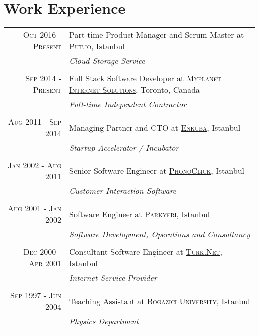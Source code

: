 \documentclass[a4paper,10pt]{article}
\begin{document}
\section{Work Experience}
\begin{tabular}{r|p{11cm}}
  \textsc{Oct 2016 - Present}   & Part-time Product Manager and Scrum Master at \href{https://put.io}{\textsc{Put.io}}, Istanbul \\
                                & \emph{Cloud Storage Service} \\

  \multicolumn{2}{c}{} \\

  \textsc{Sep 2014 - Present}   & Full Stack Software Developer at \href{https://www.myplanet.com}{\textsc{Myplanet Internet Solutions}}, Toronto, Canada \\
                                & \emph{Full-time Independent Contractor} \\

  \multicolumn{2}{c}{} \\

  \textsc{Aug 2011 - Sep 2014}  & Managing Partner and CTO at \href{http://www.enkuba.com}{\textsc{Enkuba}}, Istanbul \\
                                & \emph{Startup Accelerator / Incubator} \\

  \multicolumn{2}{c}{} \\

  \textsc{Jan 2002 - Aug 2011}  & Senior Software Engineer at \href{http://www.phonoclick.com}{\textsc{PhonoClick}}, Istanbul \\
                                & \emph{Customer Interaction Software}  \\

  \multicolumn{2}{c}{} \\

  \textsc{Aug 2001 - Jan 2002}  & Software Engineer at \href{http://www.parkyeri.com}{\textsc{Parkyeri}}, Istanbul \\
                                & \emph{Software Development, Operations and Consultancy} \\

  \multicolumn{2}{c}{} \\

  \textsc{Dec 2000 - Apr 2001}  & Consultant Software Engineer at \href{http://turk.net/}{\textsc{Turk.Net}}, Istanbul \\
                                & \emph{Internet Service Provider} \\

  \multicolumn{2}{c}{} \\

  \textsc{Sep 1997 - Jun 2004}  & Teaching Assistant at \href{http://www.boun.edu.tr/}{\textsc{Bogazici University}}, Istanbul \\
                                & \emph{Physics Department} \\

  \multicolumn{2}{c}{} \\

\end{tabular}
\end{document}
